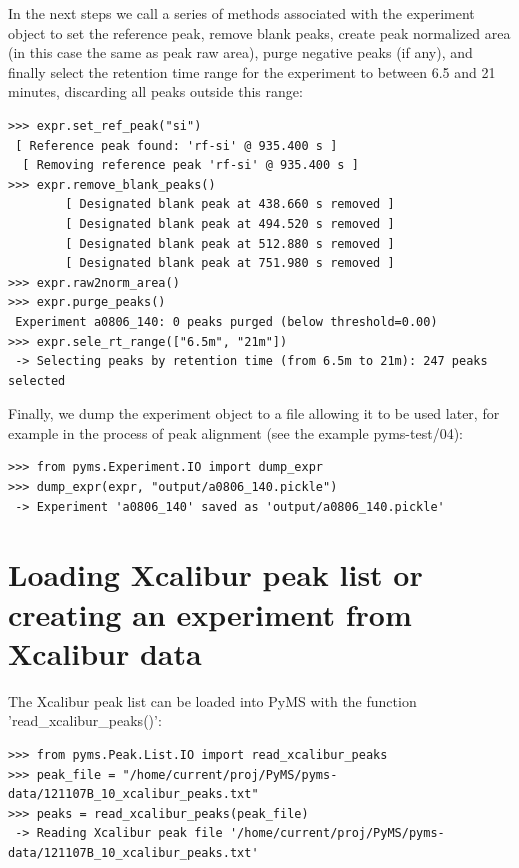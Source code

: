 \noindent
In the next steps we call a series of methods associated with the experiment
object to set the reference peak, remove blank peaks, create peak normalized
area (in this case the same as peak raw area), purge negative peaks (if
any), and finally select the retention time range for the experiment to
between 6.5 and 21 minutes, discarding all peaks outside this range:

\begin{verbatim}
>>> expr.set_ref_peak("si")
 [ Reference peak found: 'rf-si' @ 935.400 s ]
  [ Removing reference peak 'rf-si' @ 935.400 s ]
>>> expr.remove_blank_peaks()
        [ Designated blank peak at 438.660 s removed ]
        [ Designated blank peak at 494.520 s removed ]
        [ Designated blank peak at 512.880 s removed ]
        [ Designated blank peak at 751.980 s removed ]
>>> expr.raw2norm_area()
>>> expr.purge_peaks()
 Experiment a0806_140: 0 peaks purged (below threshold=0.00)
>>> expr.sele_rt_range(["6.5m", "21m"])
 -> Selecting peaks by retention time (from 6.5m to 21m): 247 peaks selected
\end{verbatim}

Finally, we dump the experiment object to a file allowing it to be used
later, for example in the process of peak alignment (see the example
pyms-test/04):

\begin{verbatim}
>>> from pyms.Experiment.IO import dump_expr
>>> dump_expr(expr, "output/a0806_140.pickle")
 -> Experiment 'a0806_140' saved as 'output/a0806_140.pickle'
\end{verbatim}

\section{Loading Xcalibur peak list or creating an experiment from Xcalibur data}


The Xcalibur peak list can be loaded into PyMS with the function 'read\_xcalibur\_peaks()':

\begin{verbatim}
>>> from pyms.Peak.List.IO import read_xcalibur_peaks
>>> peak_file = "/home/current/proj/PyMS/pyms-data/121107B_10_xcalibur_peaks.txt"
>>> peaks = read_xcalibur_peaks(peak_file)
 -> Reading Xcalibur peak file '/home/current/proj/PyMS/pyms-data/121107B_10_xcalibur_peaks.txt'
\end{verbatim}

